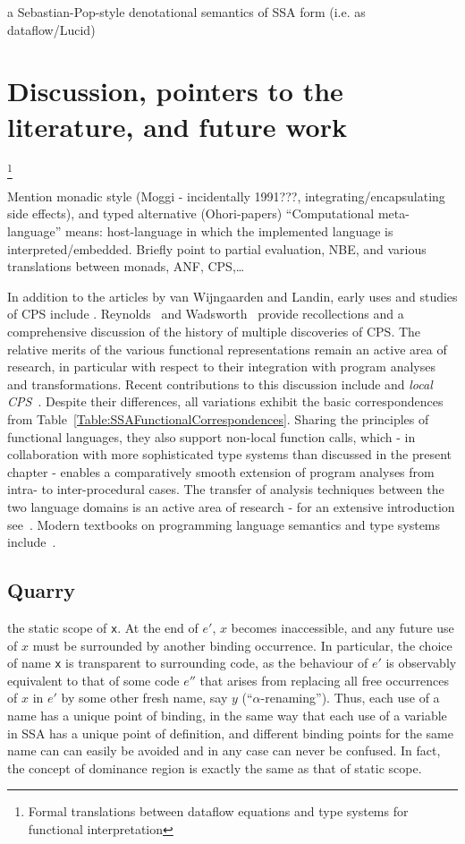 a Sebastian-Pop-style denotational semantics of SSA form (i.e. as
dataflow/Lucid)



\section{Discussion, pointers to the literature, and future work}
\label{section:Part1:Semantics:Discussion}
\footnote{Formal translations between dataflow equations and type
  systems for functional interpretation}

Mention monadic style (Moggi - incidentally 1991???,
integrating/encapsulating side effects), and typed alternative
(Ohori-papers) ``Computational meta-language'' means: host-language in
which the implemented language is interpreted/embedded.  Briefly point
to partial evaluation, NBE, and various translations between monads,
ANF, CPS,\ldots

In addition to the articles by van Wijngaarden and Landin, early uses
and studies of CPS include \cite{Reynolds:1972,Plotkin75}.
Reynolds~\cite{Reynolds:LSC1993} and Wadsworth~\cite{Wadsworth00}
provide recollections and a comprehensive discussion of the history of
multiple discoveries of CPS. The relative merits of the various
functional representations remain an active area of research, in
particular with respect to their integration with program analyses and
transformations. Recent contributions to this discussion include
\cite{Kennedy} and \emph{local CPS}~\cite{}. Despite their
differences, all variations exhibit the basic correspondences from
Table~\ref{Table:SSAFunctionalCorrespondences}. Sharing the principles
of functional languages, they also support non-local function calls,
which - in collaboration with more sophisticated type systems than
discussed in the present chapter - enables a comparatively smooth
extension of program analyses from intra- to inter-procedural
cases. The transfer of analysis techniques between the two language
domains is an active area of research - for an extensive introduction
see~\cite{NielsenNielsenHankin}. Modern textbooks on programming
language semantics and type systems
include~\cite{Winskel,Pierce,Reynolds}.


\subsection{Quarry}

the static scope of \verb|x|.  At the end
of $e'$, $x$ becomes inaccessible, and any future use of $x$ must be
surrounded by another binding occurrence. In particular, the choice of
name \verb|x| is transparent to surrounding code, as the behaviour of
$e'$ is observably equivalent to that of some code $e''$ that arises
from replacing all free occurrences of $x$ in $e'$ by some other fresh
name, say $y$ (``$\alpha$-renaming'').  Thus, each use of a
name has a unique point of binding, in the same way that each use
of a variable in SSA has a unique point of definition, and different
binding points for the same name can can easily be avoided
and in any case can never be confused. In fact, the concept of
dominance region is exactly the same as that of static scope.

